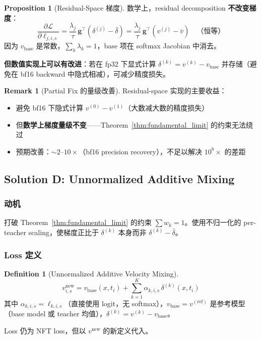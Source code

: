 \documentclass[11pt,a4paper]{article}
\newcommand{\loss}{\mathcal{L}}
\theoremstyle{definition}
\newtheorem{definition}{Definition}
\newtheorem{remark}{Remark}
\newtheorem{proposition}{Proposition}
\begin{document}
\begin{proposition}[Residual-Space 梯度]
数学上，residual decomposition \textbf{不改变梯度}：
\begin{equation}
\frac{\partial \loss}{\partial \ell_{j,i,s}} = \frac{\lambda_j}{\tau}\,\mathbf{g}^\top\left(\delta^{(j)} - \bar{\delta}\right) = \frac{\lambda_j}{\tau}\,\mathbf{g}^\top\left(v^{(j)} - \bar{v}\right) \quad\text{（恒等）}
\end{equation}
因为 $v_{\mathrm{base}}$ 是常数，$\sum_k \lambda_k = 1$，base 项在 softmax Jacobian 中消去。

\textbf{但数值实现上可以有改进}：若在 fp32 下显式计算 $\delta^{(k)} = v^{(k)} - v_{\mathrm{base}}$ 并存储（避免在 bf16 backward 中隐式相减），可减少精度损失。
\end{proposition}

\begin{remark}[Partial Fix 的量级改善]
Residual-space 实现的主要收益：
\begin{itemize}[leftmargin=1em]
\item 避免 bf16 下隐式计算 $v^{(0)} - v^{(1)}$（大数减大数的精度损失）
\item 但\textbf{数学上梯度量级不变}——Theorem~\ref{thm:fundamental_limit} 的约束无法绕过
\item 预期改善：$\sim 2$--$10\times$（bf16 precision recovery），不足以解决 $10^8\times$ 的差距
\end{itemize}
\end{remark}

\subsection{Solution D: Unnormalized Additive Mixing}

\subsubsection{动机}
打破 Theorem~\ref{thm:fundamental_limit} 的约束 $\sum w_k = 1$。使用不归一化的 per-teacher scaling，使梯度正比于 $\delta^{(k)}$ 本身而非 $\delta^{(k)} - \bar{\delta}$。

\subsubsection{Loss 定义}

\begin{definition}[Unnormalized Additive Velocity Mixing]
\begin{equation}
\boxed{
v^{\mathrm{new}}_{i,s} = v_{\mathrm{base}}(x, t_i) + \sum_{k=1}^K \alpha_{k,i,s}\, \delta^{(k)}(x, t_i)
}
\label{eq:unnormalized_mix}
\end{equation}
其中 $\alpha_{k,i,s} = \ell_{k,i,s}$（直接使用 logit，无 softmax），$v_{\mathrm{base}} = v^{(\mathrm{ref})}$ 是参考模型（base model 或 teacher 均值），$\delta^{(k)} = v^{(k)} - v_{\mathrm{base}}$。

Loss 仍为 NFT loss，但以 $v^{\mathrm{new}}$ 的新定义代入。
\end{definition}
\end{document}
